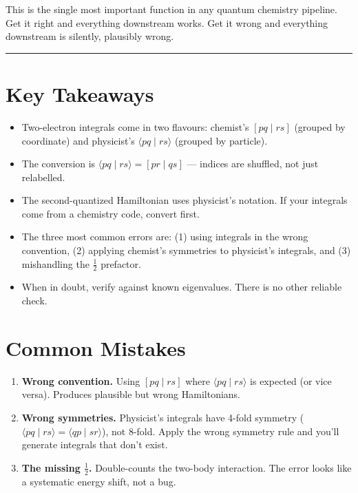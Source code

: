 \documentclass[
  11pt,
  oneside]{book}
\providecommand{\tightlist}{%
  \setlength{\itemsep}{0pt}\setlength{\parskip}{0pt}}
\begin{document}
This is the single most important function in any quantum chemistry
pipeline. Get it right and everything downstream works. Get it wrong and
everything downstream is silently, plausibly wrong.

\begin{center}\rule{0.5\linewidth}{0.5pt}\end{center}

\section{Key Takeaways}\label{key-takeaways-1}

\begin{itemize}
\tightlist
\item
  Two-electron integrals come in two flavours: chemist's
  \([pq \mid rs]\) (grouped by coordinate) and physicist's
  \(\langle pq \mid rs\rangle\) (grouped by particle).
\item
  The conversion is \(\langle pq \mid rs\rangle = [pr \mid qs]\) ---
  indices are shuffled, not just relabelled.
\item
  The second-quantized Hamiltonian uses physicist's notation. If your
  integrals come from a chemistry code, convert first.
\item
  The three most common errors are: (1) using integrals in the wrong
  convention, (2) applying chemist's symmetries to physicist's
  integrals, and (3) mishandling the \(\frac{1}{2}\) prefactor.
\item
  When in doubt, verify against known eigenvalues. There is no other
  reliable check.
\end{itemize}

\section{Common Mistakes}\label{common-mistakes-1}

\begin{enumerate}
\def\labelenumi{\arabic{enumi}.}
\item
  \textbf{Wrong convention.} Using \([pq \mid rs]\) where
  \(\langle pq \mid rs\rangle\) is expected (or vice versa). Produces
  plausible but wrong Hamiltonians.
\item
  \textbf{Wrong symmetries.} Physicist's integrals have 4-fold symmetry
  (\(\langle pq \mid rs\rangle = \langle qp \mid sr\rangle\)), not
  8-fold. Apply the wrong symmetry rule and you'll generate integrals
  that don't exist.
\item
  \textbf{The missing \(\frac{1}{2}\).} Double-counts the two-body
  interaction. The error looks like a systematic energy shift, not a
  bug.
\end{enumerate}
\end{document}
